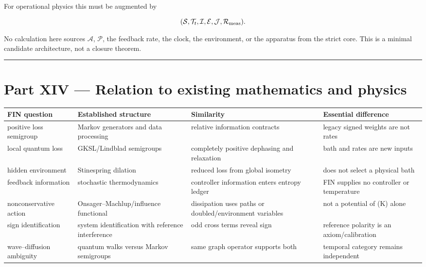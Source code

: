 \documentclass[11pt,a4paper,openany]{report}
\begin{document}
For operational physics this must be augmented by

\[
(\mathcal S,\mathcal T_t,\mathcal I,\mathcal E,\mathcal J,\mathcal R_{\rm meas}).
\]

No calculation here sources \(\mathcal{A}\), \(\mathcal{P}\), the feedback rate, the clock, the environment, or the apparatus from the strict core. This is a minimal candidate architecture, not a closure theorem.

\par\medskip\hrule\medskip

\chapter{Part XIV — Relation to existing mathematics and physics}

\begin{center}
\begingroup\small
\setlength{\tabcolsep}{3.5pt}
\renewcommand{\arraystretch}{1.16}
\begin{longtable}{@{}p{}p{}p{}p{}@{}}
\toprule
\textbf{FIN question} & \textbf{Established structure} & \textbf{Similarity} & \textbf{Essential difference} \\
\midrule
\endhead
positive loss semigroup & Markov generators and data processing & relative information contracts & legacy signed weights are not rates \\
local quantum loss & GKSL/\allowbreak{}Lindblad semigroups & completely positive dephasing and relaxation & bath and rates are new inputs \\
hidden environment & Stinespring dilation & reduced loss from global isometry & does not select a physical bath \\
feedback information & stochastic thermodynamics & controller information enters entropy ledger & FIN supplies no controller or temperature \\
nonconservative action & Onsager–Machlup/\allowbreak{}influence functional & dissipation uses paths or doubled/\allowbreak{}environment variables & not a potential of (K) alone \\
sign identification & system identification with reference interference & odd cross terms reveal sign & reference polarity is an axiom/\allowbreak{}calibration \\
wave–diffusion ambiguity & quantum walks versus Markov semigroups & same graph operator supports both & temporal category remains independent \\
\bottomrule
\end{longtable}
\endgroup
\end{center}
\end{document}
